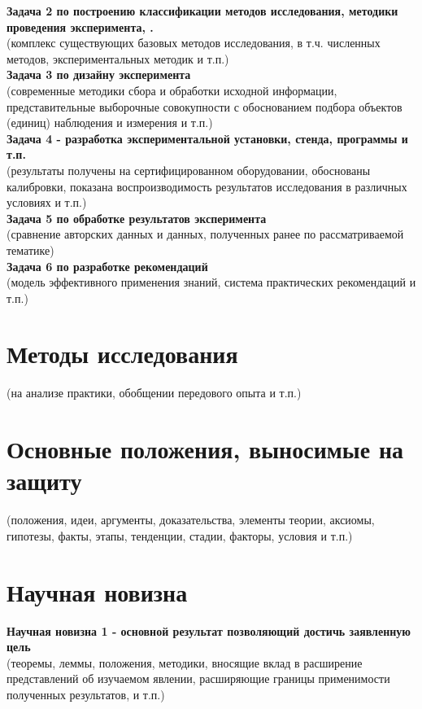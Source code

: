 \textbf{Задача 2 по построению классификации методов исследования, методики проведения эксперимента, .}\\
(комплекс существующих базовых методов исследования, в т.ч. численных методов, экспериментальных методик и т.п.)\\

\textbf{Задача 3 по дизайну эксперимента}\\
(современные методики сбора и обработки исходной информации, представительные выборочные совокупности с обоснованием подбора объектов (единиц) наблюдения и измерения и т.п.)\\

\textbf{Задача 4 - разработка экспериментальной установки, стенда, программы и т.п.}\\
(результаты получены на сертифицированном оборудовании, обоснованы калибровки, показана воспроизводимость результатов исследования в различных условиях и т.п.)\\

\textbf{Задача 5 по обработке результатов эксперимента}\\
(сравнение авторских данных и данных, полученных ранее по рассматриваемой тематике)\\

\textbf{Задача 6 по разработке рекомендаций}\\
(модель эффективного применения знаний, система практических рекомендаций и т.п.)

\section*{Методы исследования}
(на анализе практики, обобщении передового опыта и т.п.)
\section*{Основные положения, выносимые на защиту}
(положения, идеи, аргументы, доказательства, элементы теории, аксиомы, гипотезы, факты, этапы, тенденции, стадии, факторы, условия и т.п.)
\section*{Научная новизна}
\textbf{Научная новизна 1 - основной результат позволяющий достичь заявленную цель}\\
(теоремы, леммы, положения, методики, вносящие вклад в расширение представлений об изучаемом явлении, расширяющие границы применимости полученных результатов, и т.п.)\\

